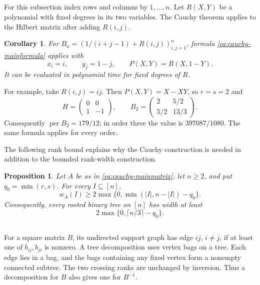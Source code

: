 \documentclass[11pt,reqno]{amsart}
\newtheorem{proposition}[theorem]{Proposition}
\newtheorem{corollary}[theorem]{Corollary}
\theoremstyle{remark}
\numberwithin{equation}{section}
\newcommand{\per}{\operatorname{per}}
\begin{document}
\subsection{}

For this subsection index rows and columns by \(1,\ldots,n\).
Let \(R(X,Y)\) be a polynomial with fixed degrees in its two
variables. The Cauchy theorem applies to the Hilbert matrix after
adding \(R(i,j)\).

\begin{corollary}\label{cor:hilbert}
For \(B_n=(1/(i+j-1)+R(i,j))_{i,j=1}^n\), formula
\eqref{eq:cauchy-mainformula} applies with
\[
 x_i=i,\qquad y_j=1-j,\qquad P(X,Y)=R(X,1-Y).
\]
It can be evaluated in polynomial time for fixed degrees of \(R\).
\end{corollary}

For example, take \(R(i,j)=ij\). Then \(P(X,Y)=X-XY\), so
\(r=s=2\) and
\[
 H=\begin{pmatrix}0&0\\1&-1\end{pmatrix},\qquad
 B_2=\begin{pmatrix}2&5/2\\5/2&13/3\end{pmatrix}.
\]
Consequently \(\per B_2=179/12\); in order three the value is
\(397087/1080\). The same formula applies for every order.

The following rank bound explains why the Cauchy construction is
needed in addition to the bounded rank-width construction.

\begin{proposition}\label{prop:cauchy-width}
Let $A$ be as in \eqref{eq:cauchy-mainmatrix}, let $n\geq2$, and put
$q_0=\min(r,s)$. For every $I\subseteq[n]$,
\[
 w_A(I)\geq2\max\{0,\min(|I|,n-|I|)-q_0\}.
\]
Consequently, every rooted binary tree on $[n]$ has width at least
\[
 2\max\{0,\lceil n/3\rceil-q_0\}.
\]
\end{proposition}




\subsection{}

For a square matrix \(B\), its undirected support graph has edge
\(ij\), \(i\ne j\), if at least one of \(b_{ij},b_{ji}\) is nonzero.
A tree decomposition uses vertex bags on a tree. Each edge lies
in a bag, and the bags containing any fixed vertex form a nonempty
connected subtree. The two crossing ranks are unchanged by
inversion. Thus a decomposition for \(B\) also gives one for
\(B^{-1}\).
\end{document}
